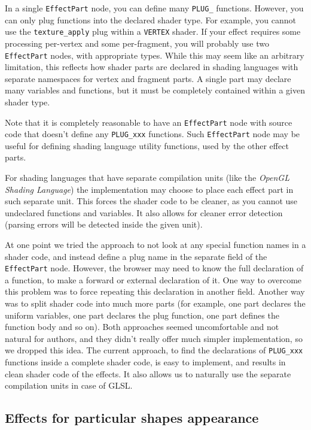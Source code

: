 \documentclass{egpubl}
\begin{document}
In a single \texttt{EffectPart} node, you can define many \texttt{PLUG\_}
functions. However, you can only plug functions into the declared shader
type. For example, you cannot use the \texttt{texture\_apply} plug within
a \texttt{VERTEX} shader.
If your effect requires some processing per-vertex and some per-fragment,
you will probably use two \texttt{EffectPart} nodes, with appropriate types.
While this may seem like an arbitrary limitation,
this reflects how shader parts are declared in shading languages with
separate namespaces for vertex and fragment parts.
A single part may declare many variables and functions,
but it must be completely contained within a given shader type.

Note that it is completely reasonable to have an \texttt{EffectPart} node
with source code that doesn't define any \texttt{PLUG\_xxx} functions.
Such \texttt{EffectPart} node may be useful for defining shading language
utility functions, used by the other effect parts.

For shading languages that have separate compilation units
(like the \emph{OpenGL Shading Language}) the implementation may choose to place
each effect part in such separate unit. This forces the shader code to be
cleaner, as you cannot use undeclared functions and variables.
It also allows for cleaner error detection (parsing errors will be detected
inside the given unit).

At one point we tried the approach
to not look at any special function names in a shader code,
and instead define a plug name in the separate field of the \texttt{EffectPart}
node. However, the browser may need to know the full declaration
of a function, to make a forward or external declaration of it.
One way to overcome this problem was to force repeating this declaration
in another field. Another way was to split shader code into much more
parts (for example, one part declares the uniform variables, one part declares
the plug function, one part defines the function body and so on).
Both approaches seemed uncomfortable and not natural for authors,
and they didn't really offer much simpler implementation, so we dropped this idea.
The current approach, to find the declarations of \texttt{PLUG\_xxx} functions
inside a complete shader code, is easy to implement, and results in clean
shader code of the effects. It also allows us to naturally use
the separate compilation units in case of GLSL.

\subsection{Effects for particular shapes appearance}
\end{document}

